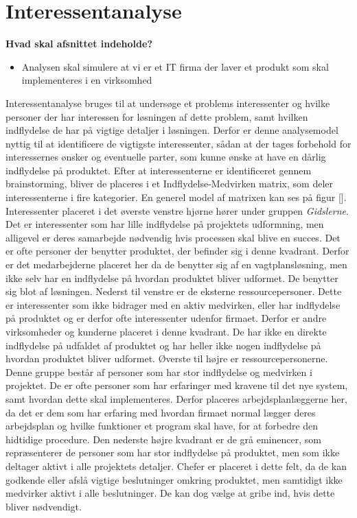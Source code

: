 \section{Interessentanalyse}
\textbf{Hvad skal afsnittet indeholde?}
\begin{itemize}
\item{Analysen skal simulere at vi er et IT firma der laver et produkt som skal implementeres i en virksomhed}

\end{itemize}
Interessentanalyse bruges til at undersøge et problems interessenter og hvilke personer der har interessen for løsningen af dette problem, samt hvilken indflydelse de har på vigtige detaljer i løsningen. Derfor er denne analysemodel nyttig til at identificere de vigtigste interessenter, sådan at der tages forbehold for interessernes ønsker og eventuelle parter, som kunne ønske at have en dårlig indflydelse på produktet. Efter at interessenterne er identificeret gennem brainstorming, bliver de placeres i et Indflydelse-Medvirken matrix, som deler interessenterne i fire kategorier. En generel model af matrixen kan ses på figur []. Interessenter placeret i det øverste venstre hjørne hører under gruppen \textit{Gidslerne}. Det er interessenter som har lille indflydelse på projektets udformning, men alligevel er deres samarbejde nødvendig hvis processen skal blive en succes. Det er ofte personer der benytter produktet, der befinder sig i denne kvadrant. Derfor er det medarbejderne placeret her da de benytter sig af en vagtplansløsning, men ikke selv har en indflydelse på hvordan produktet bliver udformet. De benytter sig blot af løsningen. Nederst til venstre er de eksterne ressourcepersoner. Dette er interessenter som ikke bidrager med en aktiv medvirken, eller har indflydelse på produktet og er derfor ofte interessenter udenfor firmaet.  Derfor er andre virksomheder og kunderne placeret i denne kvadrant. De har ikke en direkte indflydelse på udfaldet af produktet og har heller ikke nogen indflydelse på hvordan produktet bliver udformet. Øverste til højre er ressourcepersonerne. Denne gruppe består af personer som har stor indflydelse og medvirken i projektet. De er ofte personer som har erfaringer med kravene til det nye system, samt hvordan dette skal implementeres. Derfor placeres arbejdsplanlæggerne her, da det er dem som har erfaring med hvordan firmaet normal lægger deres arbejdsplan og hvilke funktioner et program skal have, for at forbedre den hidtidige procedure. Den nederste højre kvadrant er de grå eminencer, som repræsenterer de personer som har stor indflydelse på produktet, men som ikke deltager aktivt i alle projektets detaljer. Chefer er placeret i dette felt, da de kan godkende eller afslå vigtige beslutninger omkring produktet, men samtidigt ikke medvirker aktivt i alle beslutninger. De kan dog vælge at gribe ind, hvis dette bliver nødvendigt.\\

